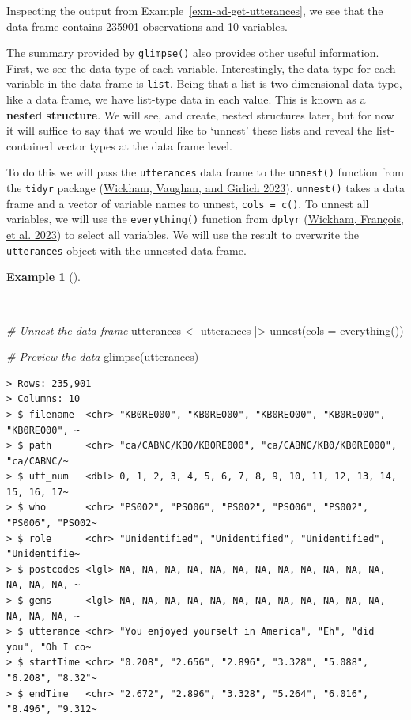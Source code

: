 \documentclass[
  letterpaper,
  DIV=11,
  numbers=noendperiod]{scrreport}
\newenvironment{Shaded}{\begin{snugshade}}{\end{snugshade}}
\newcommand{\AttributeTok}[1]{\textcolor[rgb]{0.00,0.00,0.00}{#1}}
\newcommand{\CommentTok}[1]{\textcolor[rgb]{0.00,0.00,0.00}{\textit{#1}}}
\newcommand{\FunctionTok}[1]{\textcolor[rgb]{0.00,0.00,0.00}{#1}}
\newcommand{\NormalTok}[1]{\textcolor[rgb]{0.00,0.00,0.00}{#1}}
\newcommand{\OtherTok}[1]{\textcolor[rgb]{0.00,0.00,0.00}{#1}}
\newcommand{\SpecialCharTok}[1]{\textcolor[rgb]{0.00,0.00,0.00}{#1}}
\theoremstyle{definition}
\newtheorem{example}{Example}[chapter]
\theoremstyle{remark}
\begin{document}
Inspecting the output from Example~\ref{exm-ad-get-utterances}, we see
that the data frame contains 235901 observations and 10 variables.

The summary provided by \texttt{glimpse()} also provides other useful
information. First, we see the data type of each variable.
Interestingly, the data type for each variable in the data frame is
\texttt{list}. Being that a list is two-dimensional data type, like a
data frame, we have list-type data in each value. This is known as a
\textbf{nested structure}. We will see, and create, nested structures
later, but for now it will suffice to say that we would like to `unnest'
these lists and reveal the list-contained vector types at the data frame
level.

To do this we will pass the \texttt{utterances} data frame to the
\texttt{unnest()} function from the \texttt{tidyr} package
(\protect\hyperlink{ref-R-tidyr}{Wickham, Vaughan, and Girlich 2023}).
\texttt{unnest()} takes a data frame and a vector of variable names to
unnest, \texttt{cols\ =\ c()}. To unnest all variables, we will use the
\texttt{everything()} function from \texttt{dplyr}
(\protect\hyperlink{ref-R-dplyr}{Wickham, François, et al. 2023}) to
select all variables. We will use the result to overwrite the
\texttt{utterances} object with the unnested data frame.

\begin{example}[]\protect\hypertarget{exm-ad-unnest}{}\label{exm-ad-unnest}

~

\begin{Shaded}
\begin{Highlighting}[]
\CommentTok{\# Unnest the data frame}
\NormalTok{utterances }\OtherTok{\textless{}{-}} 
\NormalTok{  utterances }\SpecialCharTok{|\textgreater{}} 
  \FunctionTok{unnest}\NormalTok{(}\AttributeTok{cols =} \FunctionTok{everything}\NormalTok{())}

\CommentTok{\# Preview the data}
\FunctionTok{glimpse}\NormalTok{(utterances)}
\end{Highlighting}
\end{Shaded}

\begin{verbatim}
> Rows: 235,901
> Columns: 10
> $ filename  <chr> "KB0RE000", "KB0RE000", "KB0RE000", "KB0RE000", "KB0RE000", ~
> $ path      <chr> "ca/CABNC/KB0/KB0RE000", "ca/CABNC/KB0/KB0RE000", "ca/CABNC/~
> $ utt_num   <dbl> 0, 1, 2, 3, 4, 5, 6, 7, 8, 9, 10, 11, 12, 13, 14, 15, 16, 17~
> $ who       <chr> "PS002", "PS006", "PS002", "PS006", "PS002", "PS006", "PS002~
> $ role      <chr> "Unidentified", "Unidentified", "Unidentified", "Unidentifie~
> $ postcodes <lgl> NA, NA, NA, NA, NA, NA, NA, NA, NA, NA, NA, NA, NA, NA, NA, ~
> $ gems      <lgl> NA, NA, NA, NA, NA, NA, NA, NA, NA, NA, NA, NA, NA, NA, NA, ~
> $ utterance <chr> "You enjoyed yourself in America", "Eh", "did you", "Oh I co~
> $ startTime <chr> "0.208", "2.656", "2.896", "3.328", "5.088", "6.208", "8.32"~
> $ endTime   <chr> "2.672", "2.896", "3.328", "5.264", "6.016", "8.496", "9.312~
\end{verbatim}

\end{example}
\end{document}
